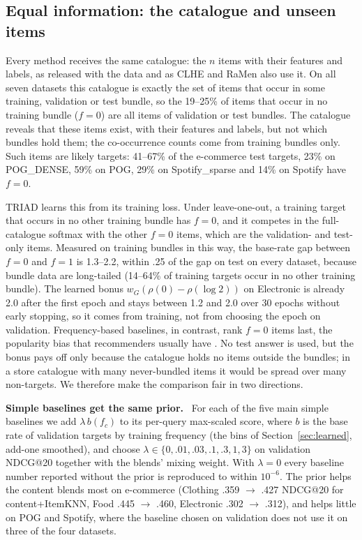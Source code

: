 \documentclass[runningheads]{llncs}
\renewcommand{\paragraph}[1]{\smallskip\noindent\textbf{#1}\ }
\begin{document}
\subsection{Equal information: the catalogue and unseen items}
\label{sec:fair}

Every method receives the same catalogue: the $n$ items with their features and labels, as released with the data
and as CLHE and RaMen also use it. On all seven datasets this catalogue is exactly the set of items that occur in some
training, validation or test bundle, so the 19--25\% of items that occur in no training
bundle ($f=0$) are all items of validation or test bundles. The catalogue reveals that these items exist, with their
features and labels, but not which bundles hold them; the co-occurrence counts come from training bundles only. Such
items are likely targets: 41--67\% of the e-commerce test targets, 23\% on POG\_DENSE, 59\% on POG, 29\% on
Spotify\_sparse and 14\% on Spotify have $f=0$.

TRIAD learns this from its training loss. Under leave-one-out, a training target that occurs in no other training
bundle has $f=0$, and it competes in the full-catalogue softmax with the other $f=0$ items, which are the
validation- and test-only items. Measured on training bundles in this way, the base-rate gap between $f=0$ and $f=1$
is 1.3--2.2, within .25 of the gap on test on every dataset, because bundle data are long-tailed (14--64\% of training
targets occur in no other training bundle). The learned bonus $w_G(\rho(0)-\rho(\log 2))$ on Electronic is already
2.0 after the first epoch and stays between 1.2 and 2.0 over 30 epochs without early stopping, so it comes from
training, not from choosing the epoch on validation. Frequency-based baselines, in contrast, rank $f=0$ items last, the popularity bias that recommenders usually
have \cite{abdollahpouri2017}.
No test answer is used, but the bonus pays off only because the catalogue holds no items outside the bundles; in a
store catalogue with many never-bundled items it would be spread over many non-targets. We therefore make the
comparison fair in two directions.

\paragraph{Simple baselines get the same prior.} For each of the five main simple baselines we add
$\lambda\,b(f_c)$ to its per-query max-scaled score, where $b$ is the base rate of validation targets by training
frequency (the bins of Section~\ref{sec:learned}, add-one smoothed), and choose $\lambda\in\{0,.01,.03,.1,.3,1,3\}$
on validation NDCG@20 together with the blends' mixing weight. With $\lambda=0$ every baseline number reported without the
prior is reproduced to within $10^{-6}$. The prior helps the content blends most on e-commerce (Clothing .359 $\to$ .427 NDCG@20 for
content+ItemKNN, Food .445 $\to$ .460, Electronic .302 $\to$ .312), and helps little on POG and Spotify, where the
baseline chosen on validation does not use it on three of the four datasets.
\end{document}
